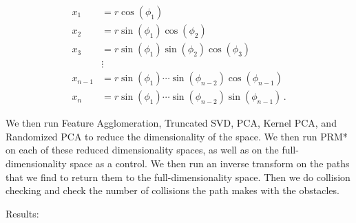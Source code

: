 \documentclass[12pt]{article}
\begin{document}
\begin{align}
x_1 &= r \cos(\phi_1) \\
x_2 &= r \sin(\phi_1) \cos(\phi_2) \\
x_3 &= r \sin(\phi_1) \sin(\phi_2) \cos(\phi_3) \\
    &\vdots\\
x_{n-1} &= r \sin(\phi_1) \cdots \sin(\phi_{n-2}) \cos(\phi_{n-1}) \\
x_n &= r \sin(\phi_1) \cdots \sin(\phi_{n-2}) \sin(\phi_{n-1}) \,.
\end{align}

We then run Feature Agglomeration, Truncated SVD, PCA, Kernel PCA, and Randomized PCA to reduce the dimensionality of the space. We then run PRM* on each of these reduced dimensionality spaces, as well as on the full-dimensionality space as a control. We then run an inverse transform on the paths that we find to return them to the full-dimensionality space. Then we do collision checking and check the number of collisions the path makes with the obstacles.

Results:
\end{document}
